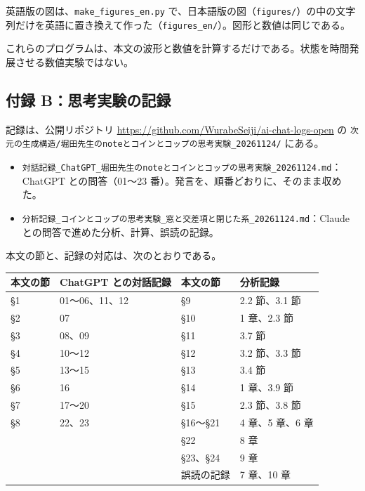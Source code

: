 \documentclass[
  a4paper,
]{ltjsarticle}
\newcounter{none} %
\providecommand{\tightlist}{%
  \setlength{\itemsep}{0pt}\setlength{\parskip}{0pt}}
\begin{document}
英語版の図は、\texttt{make\_\allowbreak{}figures\_\allowbreak{}en.py}
で、日本語版の図（\texttt{figures/\allowbreak{}}）の中の文字列だけを英語に置き換えて作った（\texttt{figures\_\allowbreak{}en/\allowbreak{}}）。図形と数値は同じである。

これらのプログラムは、本文の波形と数値を計算するだけである。状態を時間発展させる数値実験ではない。

\subsection{付録
B：思考実験の記録}\label{ux4ed8ux9332-bux601dux8003ux5b9fux9a13ux306eux8a18ux9332}

記録は、公開リポジトリ \url{https://github.com/WurabeSeiji/ai-chat-logs-open}
の
\texttt{次元の生成構造/\allowbreak{}堀田先生のnoteとコインとコップの思考実験\_\allowbreak{}20261124/\allowbreak{}}
にある。

\begin{itemize}
\tightlist
\item
  \texttt{対話記録\_\allowbreak{}ChatGPT\_\allowbreak{}堀田先生のnoteとコインとコップの思考実験\_\allowbreak{}20261124.md}：ChatGPT
  との問答（01〜23 番）。発言を、順番どおりに、そのまま収めた。
\item
  \texttt{分析記録\_\allowbreak{}コインとコップの思考実験\_\allowbreak{}窓と交差項と閉じた系\_\allowbreak{}20261124.md}：Claude
  との問答で進めた分析、計算、誤読の記録。
\end{itemize}

本文の節と、記録の対応は、次のとおりである。

{\def\LTcaptype{none} %
\begin{longtable}[]{@{}llll@{}}
\toprule\noalign{}
本文の節 & ChatGPT との対話記録 & 本文の節 & 分析記録 \\
\midrule\noalign{}
\endhead
\bottomrule\noalign{}
\endlastfoot
§1 & 01〜06、11、12 & §9 & 2.2 節、3.1 節 \\
§2 & 07 & §10 & 1 章、2.3 節 \\
§3 & 08、09 & §11 & 3.7 節 \\
§4 & 10〜12 & §12 & 3.2 節、3.3 節 \\
§5 & 13〜15 & §13 & 3.4 節 \\
§6 & 16 & §14 & 1 章、3.9 節 \\
§7 & 17〜20 & §15 & 2.3 節、3.8 節 \\
§8 & 22、23 & §16〜§21 & 4 章、5 章、6 章 \\
& & §22 & 8 章 \\
& & §23、§24 & 9 章 \\
& & 誤読の記録 & 7 章、10 章 \\
\end{longtable}
}
\end{document}
